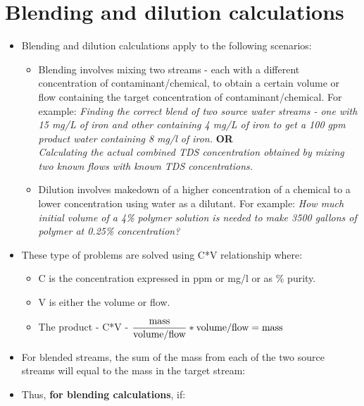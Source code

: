 \section{Blending and dilution calculations}
\begin{itemize}
\item Blending and dilution calculations apply to the following scenarios:
\begin{itemize}
\item Blending involves mixing two streams - each with a different concentration of contaminant/chemical, to obtain a certain volume or flow containing the target concentration of contaminant/chemical.  For example: \textit{Finding the correct blend of two source water streams - one with 15 mg/L of iron and other containing  4 mg/L of iron to get a 100 gpm product water containing 8 mg/l of iron.} \textbf{OR}\\
\textit{Calculating the actual combined TDS concentration obtained by mixing two known flows with known TDS concentrations.}
\item Dilution involves makedown of a higher concentration of a chemical to a lower concentration using water as a dilutant.   For example: \textit{How much initial volume of a 4\% polymer solution is needed to make 3500 gallons of polymer at 0.25\% concentration?}\\
\end{itemize}
\item These type of problems are solved using C*V relationship where:
\begin{itemize}
 \item C is the concentration expressed in ppm or mg/l or as \% purity.
 \item V is either the volume or flow.
\item The product - C*V - $\dfrac{\textrm{\textrm{mass}}}{\textrm{volume}/\textrm{flow}}*\textrm{volume/flow} = \textrm{mass}$  
\end{itemize}
\item For blended streams, the sum of the mass from each of the two source streams will equal to the mass in the target stream:

\item Thus, \textbf{for blending calculations}, if:\\


\end{itemize}
